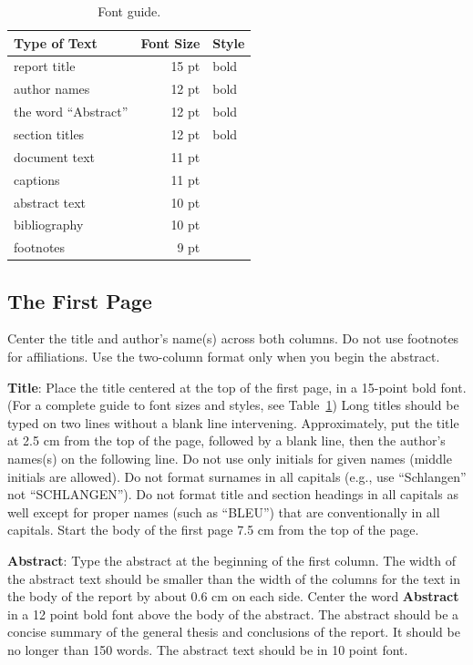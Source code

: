 \documentclass[11pt]{article}
\begin{document}
\begin{table}[h]
\begin{center}
\begin{tabular}{|l|rl|}
\hline \bf Type of Text & \bf Font Size & \bf Style \\ \hline
report title & 15 pt & bold \\
author names & 12 pt & bold \\
the word ``Abstract'' & 12 pt & bold \\
section titles & 12 pt & bold \\
document text & 11 pt  &\\
captions & 11 pt & \\
abstract text & 10 pt & \\
bibliography & 10 pt & \\
footnotes & 9 pt & \\
\hline
\end{tabular}
\end{center}
\caption{\label{font-table} Font guide.}
\end{table}

\subsection{The First Page}
\label{ssec:first}

Center the title and author's name(s) across both
columns. Do not use footnotes for affiliations. Use the
two-column format only when you begin the abstract.

{\bf Title}: Place the title centered at the top of the first page, in
a 15-point bold font. (For a complete guide to font sizes and styles,
see Table~\ref{font-table}) Long titles should be typed on two lines
without a blank line intervening. Approximately, put the title at 2.5
cm from the top of the page, followed by a blank line, then the
author's names(s) on the following line. Do not
use only initials for given names (middle initials are allowed). Do
not format surnames in all capitals (e.g., use ``Schlangen'' not
``SCHLANGEN'').  Do not format title and section headings in all
capitals as well except for proper names (such as ``BLEU'') that are
conventionally in all capitals. Start the body of the first page 7.5 cm from the top of the
page.

{\bf Abstract}: Type the abstract at the beginning of the first
column. The width of the abstract text should be smaller than the
width of the columns for the text in the body of the report by about
0.6 cm on each side. Center the word {\bf Abstract} in a 12 point bold
font above the body of the abstract. The abstract should be a concise
summary of the general thesis and conclusions of the report. It should
be no longer than 150 words. The abstract text should be in 10 point font.
\end{document}
